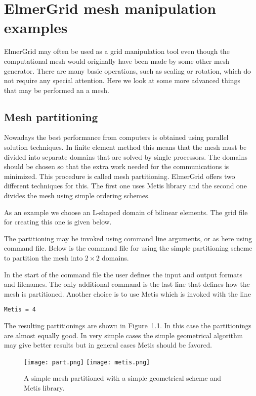 \chapter{ElmerGrid mesh manipulation examples}

ElmerGrid may often be used as a grid manipulation
tool even though the computational mesh would 
originally have been made by some other mesh
generator. There are many basic 
operations, such as scaling or rotation, which do not 
require any special attention. Here we look at some more 
advanced things that may be performed an a mesh. 



\section{Mesh partitioning}

Nowadays the best performance from computers is obtained using
parallel solution techniques. In finite element method this
means that the mesh must be divided into separate domains 
that are solved by single processors. The domains should 
be chosen so that the extra work needed for the communications is
minimized. This procedure is called mesh partitioning. 
ElmerGrid offers two different techniques for this. 
The first one uses Metis library and the second one divides the
mesh using simple ordering schemes. 

As an example we choose an L-shaped domain of bilinear elements.
The grid file for creating this one is given below.


The partitioning may be invoked using command line arguments, or
as here using command file. Below is the command file
for using the simple partitioning scheme to partition the
mesh into $2 \times 2$ domains. 
%

%
In the start of the command file the user defines the input and 
output formats and filenames. The only additional command is the 
last line that defines how the mesh is partitioned.
Another choice is to use Metis which is invoked with the line
\begin{verbatim}
Metis = 4
\end{verbatim}
The resulting partitionings are shown in Figure~\ref{pic50}. In this case
the partitionings are almost equally good. In very simple
cases the simple geometrical algorithm may give better results
but in general cases Metis should be favored.
%
\begin{figure}
\begin{center}
\texttt{[image: part.png]}
\texttt{[image: metis.png]}
\end{center}
\caption{A simple mesh partitioned with a simple geometrical scheme and 
Metis library.}
\label{pic50}
\end{figure}


